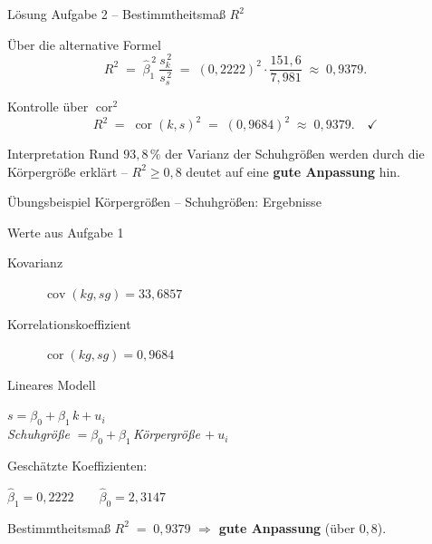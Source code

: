 \documentclass[aspectratio=169,11pt]{beamer}
\begin{document}
\begin{frame}{Lösung Aufgabe 2 -- Bestimmtheitsmaß $R^{2}$}
  \begin{block}{Über die alternative Formel}
    \[
      R^{2}
        \;=\; \hat{\beta}_1^{\,2}\,\frac{s_k^{\,2}}{s_s^{\,2}}
        \;=\; (0{,}2222)^{2}\cdot\frac{151{,}6}{7{,}981}
        \;\approx\; 0{,}9379.
    \]
  \end{block}

  \begin{block}{Kontrolle über $\operatorname{cor}^{2}$}
    \[
      R^{2}
        \;=\; \operatorname{cor}(k,s)^{2}
        \;=\; (0{,}9684)^{2}
        \;\approx\; 0{,}9379. \quad\checkmark
    \]
  \end{block}

  \begin{alertblock}{Interpretation}
    Rund $93{,}8\,\%$ der Varianz der Schuhgrößen werden durch die
    Körpergröße erklärt -- $R^{2} \ge 0{,}8$ deutet auf eine
    \textbf{gute Anpassung} hin.
  \end{alertblock}
\end{frame}

\begin{frame}{Übungsbeispiel Körpergrößen -- Schuhgrößen: Ergebnisse}
  \begin{block}{Werte aus Aufgabe 1}
    \begin{description}
      \item[Kovarianz] $\operatorname{cov}(\mathit{kg},\mathit{sg}) = 33{,}6857$
      \item[Korrelationskoeffizient] $\operatorname{cor}(\mathit{kg},\mathit{sg}) = 0{,}9684$
    \end{description}
  \end{block}

  \begin{exampleblock}{Lineares Modell}
    \begin{center}
      $\displaystyle s = \beta_0 + \beta_1\,k + u_i$\\[0.2em]
      \emph{Schuhgröße} $= \beta_0 + \beta_1\,$\emph{Körpergröße}$\,+ u_i$
    \end{center}
    Geschätzte Koeffizienten:
    \begin{center}
      $\hat{\beta}_1 = 0{,}2222 \qquad \hat{\beta}_0 = 2{,}3147$
    \end{center}
  \end{exampleblock}

  \begin{alertblock}{Bestimmtheitsmaß}
    $R^{2} \;=\; 0{,}9379$ \quad $\Rightarrow$ \textbf{gute Anpassung}
    (über $0{,}8$).
  \end{alertblock}
\end{frame}
\end{document}
